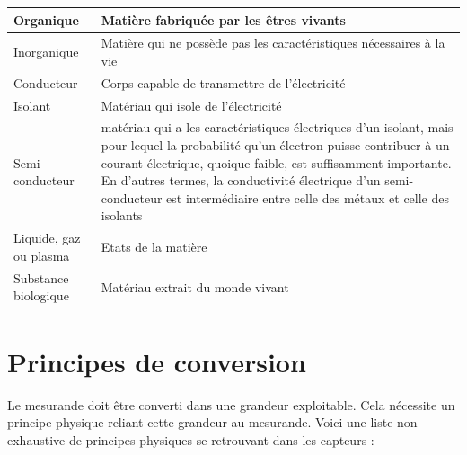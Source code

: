 \begin {center}
\begin{tabular}{|p{4.2cm}|p{9.5cm}|}
\hline
Organique &	Matière fabriquée par les êtres vivants \\
\hline
Inorganique &	Matière qui ne possède pas les caractéristiques nécessaires à la vie \\
\hline
Conducteur &	Corps capable de transmettre de l'électricité \\
\hline
Isolant &	Matériau qui isole de l'électricité \\
\hline
Semi-conducteur &	matériau qui a les caractéristiques électriques d'un isolant, mais pour lequel la probabilité qu'un électron puisse contribuer à un courant électrique, quoique faible, est suffisamment importante. En d'autres termes, la conductivité électrique d'un semi-conducteur est intermédiaire entre celle des métaux et celle des isolants \\
\hline
Liquide, gaz ou plasma &	Etats de la matière \\
\hline
Substance biologique &	Matériau extrait du monde vivant \\
\hline
\end{tabular}
\end{center}

\section{Principes de conversion}

Le mesurande doit être converti dans une grandeur exploitable. Cela nécessite un principe physique reliant cette grandeur au mesurande. Voici une liste non exhaustive de principes physiques se retrouvant dans les capteurs :

